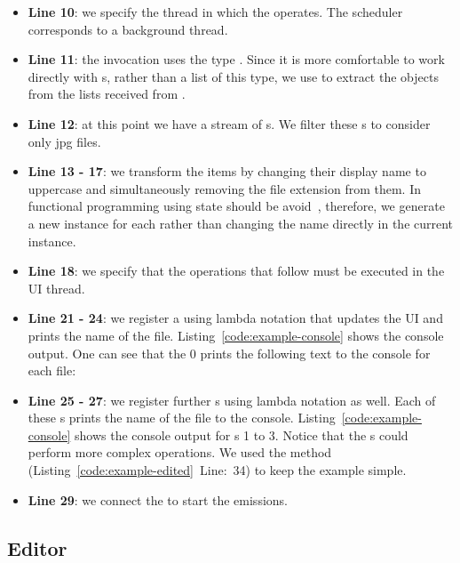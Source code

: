 \documentclass[type=bsc,accentcolor=tud9c]{tudthesis}
\begin{document}
\begin{itemize}
	\item {\bf Line 10}: we specify the thread in which the  operates. The scheduler  corresponds to a background thread.
	\item {\bf Line 11}: the  invocation uses the type . Since it is more comfortable to work directly with s, rather than a list of this type, we use  to extract the  objects from the lists received from .
	\item {\bf Line 12}: at this point we have a stream of s. We filter these s to consider only jpg files.
	\item {\bf Line 13 - 17}: we transform the items by changing their display name to uppercase and simultaneously removing the file extension from them. In functional programming using state should be avoid~\cite{bookFunctionalProgramming}, therefore, we generate a new instance for each  rather than changing the name directly in the current instance. 
	\item {\bf Line 18}: we specify that the operations that follow must be executed in the UI thread.
	\item {\bf Line 21 - 24}: we register a  using lambda notation that updates the UI and prints the name of the file. Listing~\ref{code:example-console} shows the console output. One can see that the  0 prints the following text to the console for each file: 
	\item {\bf Line 25 - 27}: we register further s using lambda notation as well. Each of these s prints the name of the file to the console. Listing~\ref{code:example-console} shows the console output for s 1 to 3. Notice that the s could perform more complex operations. We used the method  (Listing~\ref{code:example-edited}~Line:~34) to keep the example simple.
	\item {\bf Line 29}: we connect the  to start the emissions.
\end{itemize}





\newpage
\subsection{Editor}
\end{document}
